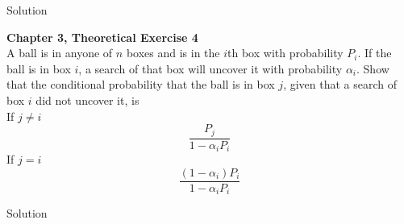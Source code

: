 \documentclass{article}
\begin{document}
\begin{spacing}{1.1}
\begin{homeworkProblem}
\begin{homeworkSection}{Solution}
  \end{homeworkSection}
\end{homeworkProblem}
\begin{comment}
If $E$ and $F$ are mutually exclusive events in an experiment, 
then $P( E \cup F) = P( E) + P( F)$. We desire to compute the probability that $E$ occurs
before $F$ , which we will denote by $p$. To compute $p$ we condition on the
three mutually exclusive events $E$, $F$ , or $(E \cup F )^c$. This last event
are all the outcomes not in $E$ or $F$. Letting the event $A$ be the event
that $E$ occurs before $F$, we have that
\[p = P( A|E) P( E) + P( A|F) P(F ) + P( A|(E \cup F )^c) P( (E \cup F )^c)\] . 

\[P( A|E) = 1\]
\[P( A|F) = 0\] 
\[P( A|(E \cup F)^c) = p\], 

since if neither E or F happen the next
experiment will have $E$ before $F$ (and thus event $A$ with probability $p$).
Thus we have that 

\[p = P( E) + p P( (E \cup F)^c)\]
\[= P( E) + p (1 − P( E \cup F))\]
\[= P( E) + p (1 − P( E) − P( F))\]

Solving for $p$ gives 
\[p = \frac{ P( E)}{ P( E) + P( F)\]
as we were to show. 

\end{comment}
\newpage
\begin{homeworkProblem}
  {\bf Chapter 3, Theoretical Exercise 4}\\
  A ball is in anyone of $n$ boxes and is in the $i$th box with 
  probability $P_i$. If the ball is in box $i$, a search of that 
  box will uncover it with probability $\alpha_i$. Show that the 
  conditional probability that the ball is in box $j$, given that 
  a search of box $i$ did not uncover it, is \\
  If $j \neq i$
    \[\frac{ P_j}{ 1 - \alpha_i P_i}\]
  If $j = i$
    \[\frac{ (1 - \alpha_i) P_i}{ 1 - \alpha_i P_i}\]
  \begin{homeworkSection}{Solution}
    
  \end{homeworkSection}
\end{homeworkProblem}
\end{spacing}
\end{document}
